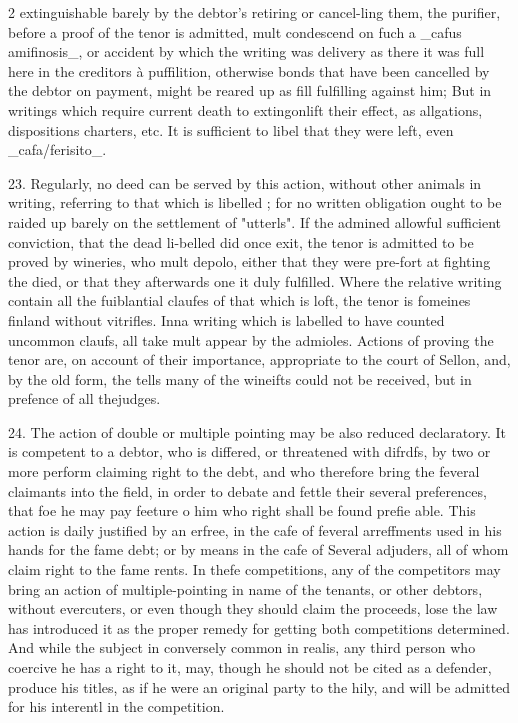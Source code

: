 \documentclass[10pt]{article}
\begin{document}
\begin{multicols}{2}\raggedcolumns
extinguishable barely by the debtor’s retiring or cancel-ling them, the purifier, before a proof of the tenor is admitted, mult condescend on fuch a \_cafus amifinosis\_, or accident by which the writing was delivery as there it was full here in the creditors à puffilition, otherwise bonds that have been cancelled by the debtor on payment, might be reared up as fill fulfilling against him; But in writings which require current death to extingonlift their effect, as allgations, dispositions charters, etc. It is sufficient to libel that they were left, even \_cafa/ferisito\_.

23. Regularly, no deed can be served by this action, without other animals in writing, referring to that which is libelled ; for no written obligation ought to be raided up barely on the settlement of "utterls". If the admined allowful sufficient conviction, that the dead li-belled did once exit, the tenor is admitted to be proved by wineries, who mult depolo, either that they were pre-fort at fighting the died, or that they afterwards one it duly fulfilled. Where the relative writing contain all the fuiblantial claufes of that which is loft, the tenor is fomeines finland without vitrifles. Inna writing which is labelled to have counted uncommon claufs, all take mult appear by the admioles. Actions of proving the tenor are, on account of their importance, appropriate to the court of Sellon, and, by the old form, the tells many of the wineifts could not be received, but in prefence of all thejudges.

24. The action of double or multiple pointing may be also reduced declaratory. It is competent to a debtor, who is differed, or threatened with difrdfs, by two or more perform claiming right to the debt, and who therefore bring the feveral claimants into the field, in order to debate and fettle their several preferences, that foe he may pay feeture o him who right shall be found prefie able. This action is daily justified by an erfree, in the cafe of feveral arreffments used in his hands for the fame debt; or by means in the cafe of Several adjuders, all of whom claim right to the fame rents. In thefe competitions, any of the competitors may bring an action of multiple-pointing in name of the tenants, or other debtors, without evercuters, or even though they should claim the proceeds, lose the law has introduced it as the proper remedy for getting both competitions determined. And while the subject in conversely common in realis, any third person who coercive he has a right to it, may, though he should not be cited as a defender, produce his titles, as if he were an original party to the hily, and will be admitted for his interentl in the competition.


\end{multicols}
\end{document}
